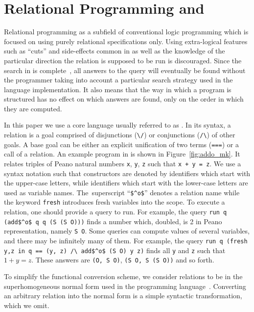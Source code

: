 \section{Relational Programming and \mk}
\label{sec:mk}






Relational programming as a subfield of conventional logic programming which is focused on using purely relational specifications only.
Using extra-logical features such as ``cuts'' and side-effects common in \prolog as well as the knowledge of the particular direction the relation is supposed to be run is discouraged.
Since the search in \mk is complete~\cite{kiselyov2005backtracking,rozplokhas2020certified}, all answers to the query will eventually be found without the programmer taking into account a particular search strategy used in the language implementation.
It also means that the way in which a program is structured has no effect on which answers are found, only on the order in which they are computed.

In this paper we use a core \mk language usually referred to as \micro.
In its syntax, a relation is a goal comprised of disjunctions (\lstinline{\/}) or conjunctions (\lstinline{/\}) of other goals.
A base goal can be either an explicit unification of two terms (\lstinline{===}) or a call of a relation.
An example program in \mk is shown in Figure~\ref{fig:addo_mk}.
It relates triples of Peano natural numbers \lstinline{x}, \lstinline{y}, \lstinline{z} such that \lstinline{x + y = z}.
We use a syntax notation such that constructors are denoted by identifiers which start with the upper-case letters, while identifiers which start with the lower-case letters are used as variable names.
The~superscript ``\lstinline{$^o$}'' denotes a relation name while the keyword \lstinline{fresh} introduces fresh variables into the scope.
To execute a relation, one should provide a query to run.
For example, the query \lstinline{run q (add$^o$ q q (S (S O)))} finds a number which, doubled, is 2 in Peano representation, namely \lstinline{S O}.
Some queries can compute values of several variables, and there may be infinitely many of them.
For example, the query \lstinline{run q (fresh y,z in q == (y, z) /\ add$^o$ (S O) y z)} finds all \lstinline{y} and \lstinline{z} such that $1 + y = z$.
These answers are \lstinline{(O, S O)}, \lstinline{(S O, S (S O))} and so forth.


To simplify the functional conversion scheme, we consider \mk relations to be in the superhomogeneous normal form used in the \merc programming language~\cite{somogyi1996execution}.
Converting an arbitrary \mk relation into the normal form is a simple syntactic transformation, which we omit.


